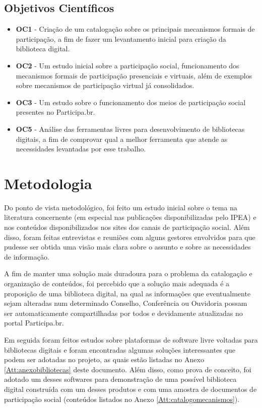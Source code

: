 \subsection*{Objetivos Científicos}

\begin{itemize}
\item \textbf{OC1} - Criação de um catalogação sobre os principais mecanismos formais de participação, a fim de fazer um levantamento inicial para criação da biblioteca digital.
\item \textbf{OC2} - Um estudo inicial sobre a participação social, funcionamento dos mecanismos formais de participação presenciais e virtuais, além de exemplos sobre mecanismos de participação virtual já consolidados.
\item \textbf{OC3} - Um estudo sobre o funcionamento dos meios de participação social presentes no Participa.br.
\item \textbf{OC5} - Análise das ferramentas livres para desenvolvimento de bibliotecas digitais, a fim de comprovar qual a melhor ferramenta que atende as necessidades levantadas por esse trabalho.
\end{itemize}
	 	

\section{Metodologia}

Do ponto de vista metodológico, foi feito um estudo inicial sobre o tema na literatura concernente (em especial nas publicações disponibilizadas pelo IPEA) e nos conteúdos disponibilizados nos sites dos canais de participação social. Além disso, foram feitas entrevistas e reuniões com alguns gestores envolvidos para que pudesse ser obtida uma visão mais clara sobre o assunto e sobre as necessidades de informação.

A fim de manter uma solução mais duradoura para o problema da catalogação e organização de conteúdos, foi percebido que a solução mais adequada é a proposição de uma biblioteca digital, na qual as informações que eventualmente sejam alteradas num determinado Conselho, Conferência ou Ouvidoria possam ser automaticamente compartilhadas por todos e devidamente atualizadas no portal Participa.br.

Em seguida foram feitos estudos sobre plataformas de software livre voltadas para bibliotecas digitais e foram encontradas algumas soluções interessantes que podem ser adotadas no projeto, as quais estão listadas no Anexo \ref{Att:anexobibliotecas} deste documento. Além disso, como prova de conceito, foi adotado um desses softwares para demonstração de uma possível biblioteca digital construída com um desses produtos e com uma amostra de documentos de participação social (conteúdos listados no Anexo \ref{Att:catalogomecanismos}).

